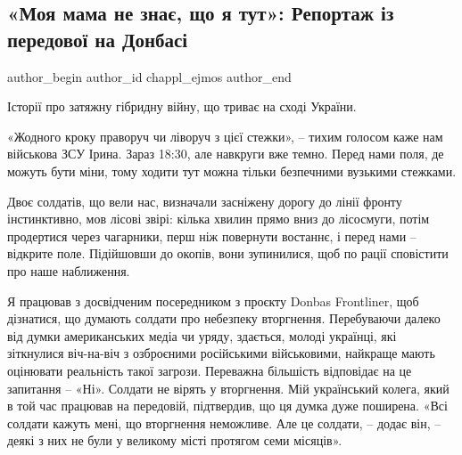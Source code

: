  
 
 
 
 
\subsection{«Моя мама не знає, що я тут»: Репортаж із передової на Донбасі}
\label{sec:14_12_2021.stz.news.ua.radiosvoboda.1.peredovaja}


\ifcmt
 author_begin
   author_id chappl_ejmos
 author_end
\fi


Історії про затяжну гібридну війну, що триває на сході України.

«Жодного кроку праворуч чи ліворуч з цієї стежки», – тихим голосом каже нам
військова ЗСУ Ірина. Зараз 18:30, але навкруги вже темно. Перед нами поля, де
можуть бути міни, тому ходити тут можна тільки безпечними вузькими стежками.

Двоє солдатів, що вели нас, визначали засніжену дорогу до лінії фронту
інстинктивно, мов лісові звірі: кілька хвилин прямо вниз до лісосмуги, потім
продертися через чагарники, перш ніж повернути востаннє, і перед нами –
відкрите поле. Підійшовши до окопів, вони зупинилися, щоб по рації сповістити
про наше наближення.


Я працював з досвідченим посередником з проєкту Donbas Frontliner, щоб
дізнатися, що думають солдати про небезпеку вторгнення. Перебуваючи далеко від
думки американських медіа чи уряду, здається, молоді українці, які зіткнулися
віч-на-віч з озброєними російськими військовими, найкраще мають оцінювати
реальність такої загрози. Переважна більшість відповідає на це запитання –
«Ні». Солдати не вірять у вторгнення. Мій український колега, який в той час
працював на передовій, підтвердив, що ця думка дуже поширена. «Всі солдати
кажуть мені, що вторгнення неможливе. Але це солдати, – додає він, – деякі з
них не були у великому місті протягом семи місяців».

